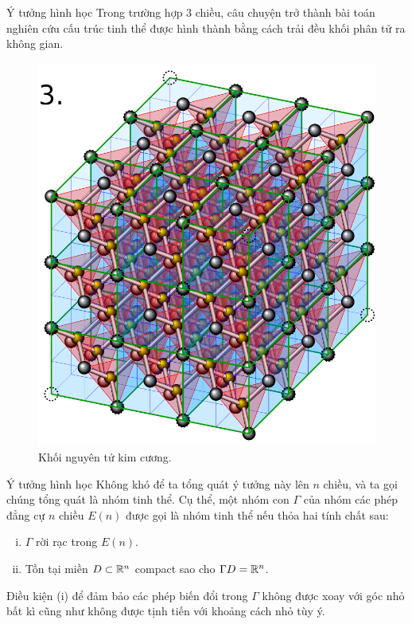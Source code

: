 \begin{frame}{Ý tưởng hình học}
    Trong trường hợp 3 chiều, câu chuyện trở thành bài toán nghiên cứu cấu trúc tinh thể được hình thành bằng cách trải đều khối phân tử ra không gian.
    \begin{figure}[ht]
        \centering
        \includegraphics[scale=0.18]{assets/diamond-cube.png}
        \caption{Khối nguyên tử kim cương.}
        \label{fig:diamond-cube}
    \end{figure}
\end{frame}

\begin{frame}{Ý tưởng hình học}
    Không khó để ta tổng quát ý tưởng này lên $n$ chiều, và ta gọi chúng tổng quát là nhóm tinh thể. Cụ thể, một nhóm con $\Gamma$ của nhóm các phép đẳng cự $n$ chiều $E(n)$ được gọi là \alert{nhóm tinh thể} nếu thỏa hai tính chất sau:
    \begin{enumerate}[(i)]
        \item $\Gamma$ rời rạc trong $E(n)$.
        \item Tồn tại miền $D \subset \mathbb R^n$ compact sao cho $\Gamma D = \mathbb R^n$.
    \end{enumerate}
    Điều kiện (i) để đảm bảo các phép biến đổi trong $\Gamma$ không được xoay với góc nhỏ bất kì cũng như không được tịnh tiến với khoảng cách nhỏ tùy ý.
\end{frame}


